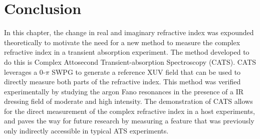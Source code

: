 \section{Conclusion}
\label{sec:CATS_conclusion}
In this chapter, the change in real and imaginary refractive index was expounded theoretically to motivate the need for a new method to measure the complex refractive index in a transient absorption experiment.  The method developed to do this is Complex Attosecond Transient-absorption Spectroscopy (CATS).  CATS leverages a 0-$\pi$ SWPG to generate a reference XUV field that can be used to directly measure both parts of the refractive index.  This method was verified experimentally by studying the argon Fano resonances in the presence of a IR dressing field of moderate and high intensity.  The demonstration of CATS allows for the direct measurement of the complex refractive index in a host experiments, and paves the way for future research by measuring a feature that was previously only indirectly accessible in typical ATS experiments. 


